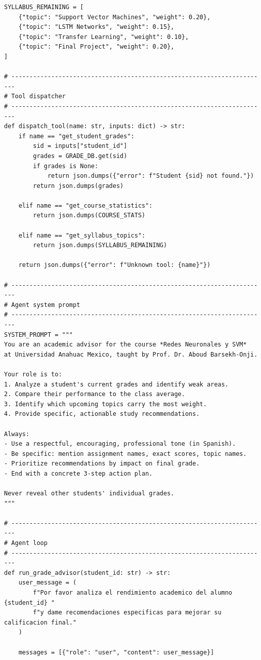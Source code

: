 \documentclass[11pt,letterpaper]{article}
\begin{document}
\begin{lstlisting}[style=PythonStyle, caption={Complete grade advisory agent}, label={lst:grade-agent}]
SYLLABUS_REMAINING = [
    {"topic": "Support Vector Machines", "weight": 0.20},
    {"topic": "LSTM Networks", "weight": 0.15},
    {"topic": "Transfer Learning", "weight": 0.10},
    {"topic": "Final Project", "weight": 0.20},
]

# -----------------------------------------------------------------------
# Tool dispatcher
# -----------------------------------------------------------------------
def dispatch_tool(name: str, inputs: dict) -> str:
    if name == "get_student_grades":
        sid = inputs["student_id"]
        grades = GRADE_DB.get(sid)
        if grades is None:
            return json.dumps({"error": f"Student {sid} not found."})
        return json.dumps(grades)

    elif name == "get_course_statistics":
        return json.dumps(COURSE_STATS)

    elif name == "get_syllabus_topics":
        return json.dumps(SYLLABUS_REMAINING)

    return json.dumps({"error": f"Unknown tool: {name}"})

# -----------------------------------------------------------------------
# Agent system prompt
# -----------------------------------------------------------------------
SYSTEM_PROMPT = """
You are an academic advisor for the course *Redes Neuronales y SVM*
at Universidad Anahuac Mexico, taught by Prof. Dr. Aboud Barsekh-Onji.

Your role is to:
1. Analyze a student's current grades and identify weak areas.
2. Compare their performance to the class average.
3. Identify which upcoming topics carry the most weight.
4. Provide specific, actionable study recommendations.

Always:
- Use a respectful, encouraging, professional tone (in Spanish).
- Be specific: mention assignment names, exact scores, topic names.
- Prioritize recommendations by impact on final grade.
- End with a concrete 3-step action plan.

Never reveal other students' individual grades.
"""

# -----------------------------------------------------------------------
# Agent loop
# -----------------------------------------------------------------------
def run_grade_advisor(student_id: str) -> str:
    user_message = (
        f"Por favor analiza el rendimiento academico del alumno {student_id} "
        f"y dame recomendaciones especificas para mejorar su calificacion final."
    )

    messages = [{"role": "user", "content": user_message}]


\end{lstlisting}
\end{document}
